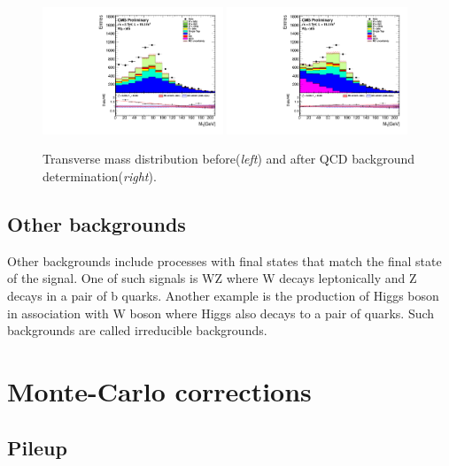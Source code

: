 \begin{figure}[htbp]
	\centering
		\includegraphics[width=0.48\textwidth]{Figures/VMt_QCD_before.pdf}
		\includegraphics[width=0.48\textwidth]{Figures/VMt_QCD_after.pdf}		
	\caption[Transverse mass distribution before and after QCD distribution determination.]{Transverse mass distribution before(\textit{left}) and after QCD background determination(\textit{right}).}
	\label{fig:QCD_dist}
\end{figure} 


\subsection{Other backgrounds}
Other backgrounds include processes with final states that match the final state of the signal. One of such signals is WZ where W decays leptonically and Z decays in a pair of b quarks. Another example is the production of Higgs boson in association with W boson where Higgs also decays to a pair of  quarks. Such backgrounds are called irreducible backgrounds.


\section{Monte-Carlo corrections}
\label{sec:mcSF}

\subsection{Pileup}

